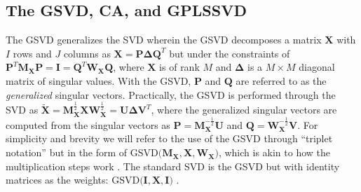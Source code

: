 \documentclass[12pt]{article}
\begin{document}
\hypertarget{the-gsvd-ca-and-gplssvd}{%
\subsection{The GSVD, CA, and GPLSSVD}\label{the-gsvd-ca-and-gplssvd}}

\label{section:GSVDCA}

The GSVD generalizes the SVD wherein the GSVD decomposes a matrix
\({\mathbf X}\) with \(I\) rows and \(J\) columns as
\({\mathbf X} = {\mathbf P} {\boldsymbol \Delta} {\mathbf Q}^{T}\) but
under the constraints of
\({\mathbf P}^{T}{\mathbf M}_{{\mathbf X}}{\mathbf P} = {\mathbf I} = {\mathbf Q}^{T}{\mathbf W}_{{\mathbf X}}{\mathbf Q}\),
where \({\mathbf X}\) is of rank \(M\) and \({\boldsymbol \Delta}\) is a
\(M \times M\) diagonal matrix of singular values. With the GSVD,
\({\mathbf P}\) and \({\mathbf Q}\) are referred to as the
\emph{generalized} singular vectors. Practically, the GSVD is performed
through the SVD as
\(\widetilde{\mathbf X} = {\mathbf M}_{{\mathbf X}}^{\frac{1}{2}}{\mathbf X}{\mathbf W}_{{\mathbf X}}^{\frac{1}{2}} = {\mathbf U} {\boldsymbol \Delta} {\mathbf V}^{T}\),
where the generalized singular vectors are computed from the singular
vectors as
\({\mathbf P} = {\mathbf M}_{{\mathbf X}}^{-\frac{1}{2}}{\mathbf U}\)
and
\({\mathbf Q} = {\mathbf W}_{{\mathbf X}}^{-\frac{1}{2}}{\mathbf V}\).
For simplicity and brevity we will refer to the use of the GSVD through
``triplet notation'' \citep{holmes_multivariate_2008} but in the form of
\(\mathrm{GSVD(} {\mathbf M}_{{\mathbf X}}, {\mathbf X}, {\mathbf W}_{{\mathbf X}} \mathrm{)}\),
which is akin to how the multiplication steps work \citep[see
also][]{beaton2018generalization}. The standard SVD is the GSVD but with
identity matrices as the weights:
\(\mathrm{GSVD(} {\mathbf I}, {\mathbf X}, {\mathbf I} \mathrm{)}\)
\citep[see also][]{takane_relationships_2003}.
\end{document}
